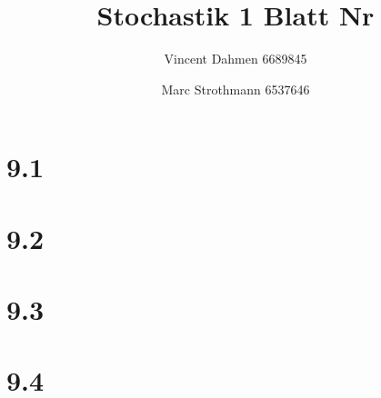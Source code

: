 \documentclass[12pt,a4paper]{article}
\title{Stochastik 1 Blatt Nr \Nr}
\author{Vincent Dahmen 6689845 \and Marc Strothmann 6537646}
\gdef\Nr{9}
\begin{document}
\maketitle{}


\section*{\Nr.1}


\section*{\Nr.2}


\section*{\Nr.3}


\section*{\Nr.4}

\end{document}
